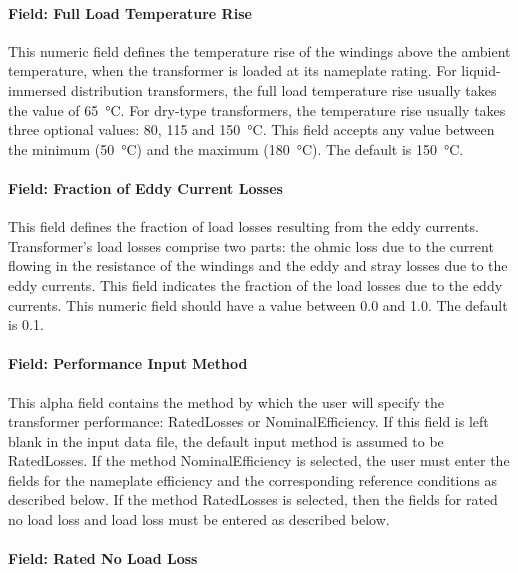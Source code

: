 \paragraph{Field: Full Load Temperature Rise}\label{field-full-load-temperature-rise}

This numeric field defines the temperature rise of the windings above the ambient temperature, when the transformer is loaded at its nameplate rating. For liquid-immersed distribution transformers, the full load temperature rise usually takes the value of \SI{65}{\celsius}. For dry-type transformers, the temperature rise usually takes three optional values: 80, 115 and \SI{150}{\celsius}. This field accepts any value between the minimum (\SI{50}{\celsius}) and the maximum (\SI{180}{\celsius}). The default is \SI{150}{\celsius}.

\paragraph{Field: Fraction of Eddy Current Losses}\label{field-fraction-of-eddy-current-losses}

This field defines the fraction of load losses resulting from the eddy currents. Transformer's load losses comprise two parts: the ohmic loss due to the current flowing in the resistance of the windings and the eddy and stray losses due to the eddy currents. This field indicates the fraction of the load losses due to the eddy currents. This numeric field should have a value between 0.0 and 1.0. The default is 0.1.

\paragraph{Field: Performance Input Method}\label{field-performance-input-method-000}

This alpha field contains the method by which the user will specify the transformer performance: RatedLosses or NominalEfficiency. If this field is left blank in the input data file, the default input method is assumed to be RatedLosses. If the method NominalEfficiency is selected, the user must enter the fields for the nameplate efficiency and the corresponding reference conditions as described below. If the method RatedLosses is selected, then the fields for rated no load loss and load loss must be entered as described below.

\paragraph{Field: Rated No Load Loss}\label{field-rated-no-load-loss}

